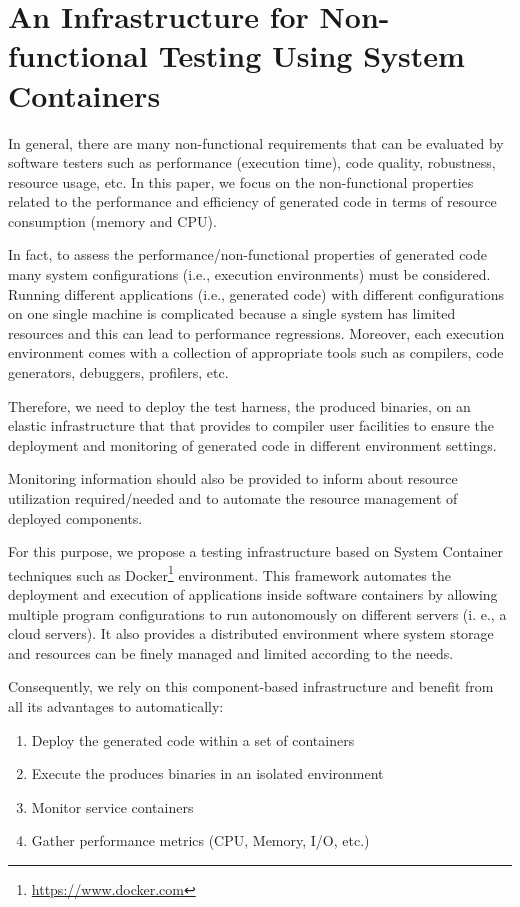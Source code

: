 \section{An Infrastructure for Non-functional Testing Using System Containers}
In general, there are many non-functional requirements that can
be evaluated by software testers such as performance
(execution time), code quality, robustness, resource usage, etc. In this paper, we focus on the non-functional properties related to the performance and efficiency of generated code in terms of
resource consumption (memory and CPU).

In fact, to assess the performance/non-functional properties of generated code many system configurations (i.e., execution environments) must be considered. Running different applications (i.e., generated code) with different configurations on one single machine is complicated because a single system has limited resources and this can lead to performance regressions. Moreover, each execution environment comes with a collection of appropriate tools such as compilers, code generators, debuggers, profilers, etc.

Therefore, we need to deploy the test harness, \ie the produced binaries, on an elastic infrastructure that that provides to compiler user facilities to ensure the deployment and monitoring of generated code in different environment settings.

Monitoring information should also be provided to inform about resource utilization required/needed and to automate the resource management of deployed components. 
			 

For this purpose, we propose a testing infrastructure based on System Container techniques such as Docker\footnote{\url{https://www.docker.com}} environment. 
This framework automates the deployment and execution of applications inside software containers by allowing multiple program configurations to run autonomously on different servers (i. e., a cloud servers).
It also provides a distributed environment where system storage and resources can be finely managed and limited according to the needs. 
 
Consequently, we rely on this component-based infrastructure and benefit from all its advantages to automatically:
\begin{enumerate}
	\item Deploy the generated code within a set of containers
	\item Execute the produces binaries in an isolated environment 
	\item Monitor service containers
	\item Gather performance metrics (CPU, Memory, I/O, etc.)
\end{enumerate}

